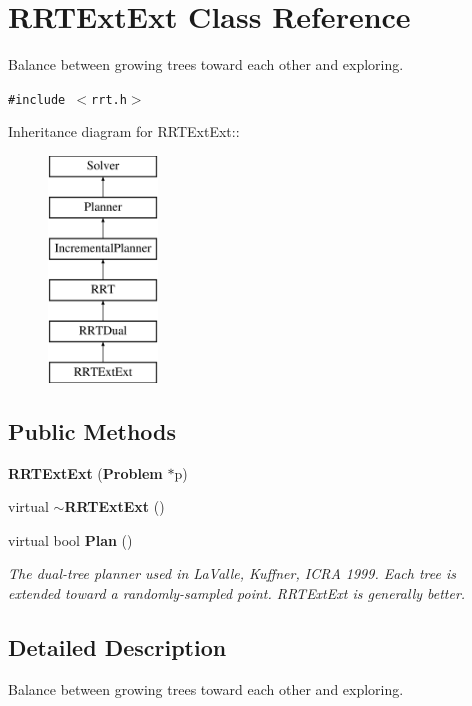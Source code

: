 \section{RRTExt\-Ext  Class Reference}
\label{class_RRTExtExt}
Balance between growing trees toward each other and exploring. 


{\tt \#include $<$rrt.h$>$}

Inheritance diagram for RRTExt\-Ext::\begin{figure}[H]
\begin{center}
\leavevmode
\includegraphics[height=6cm]{class_RRTExtExt}
\end{center}
\end{figure}
\subsection*{Public Methods}
\begin{CompactItemize}
\item 
{\bf RRTExt\-Ext} ({\bf Problem} $\ast$p)
\item 
virtual {\bf $\sim$RRTExt\-Ext} ()
\item 
virtual bool {\bf Plan} ()
\begin{CompactList}\small\item\em The dual-tree planner used in La\-Valle, Kuffner, ICRA 1999. Each tree is extended toward a randomly-sampled point. RRTExt\-Ext is generally better.\item\end{CompactList}\end{CompactItemize}


\subsection{Detailed Description}
Balance between growing trees toward each other and exploring.

